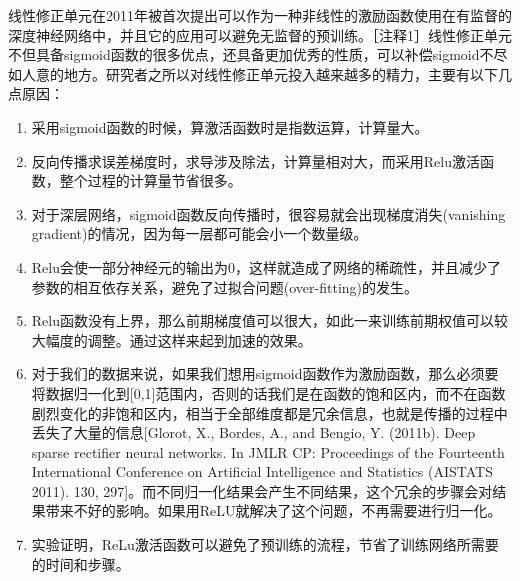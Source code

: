 		线性修正单元在2011年被首次提出可以作为一种非线性的激励函数使用在有监督的深度神经网络中，并且它的应用可以避免无监督的预训练。［注释1］线性修正单元不但具备sigmoid函数的很多优点，还具备更加优秀的性质，可以补偿sigmoid不尽如人意的地方。研究者之所以对线性修正单元投入越来越多的精力，主要有以下几点原因：
		\begin{enumerate}
		\item 采用sigmoid函数的时候，算激活函数时是指数运算，计算量大。
		\item 反向传播求误差梯度时，求导涉及除法，计算量相对大，而采用Relu激活函数，整个过程的计算量节省很多。
		\item 对于深层网络，sigmoid函数反向传播时，很容易就会出现梯度消失(vanishing gradient)的情况，因为每一层都可能会小一个数量级。
		\item Relu会使一部分神经元的输出为0，这样就造成了网络的稀疏性，并且减少了参数的相互依存关系，避免了过拟合问题(over-fitting)的发生。
		\item Relu函数没有上界，那么前期梯度值可以很大，如此一来训练前期权值可以较大幅度的调整。通过这样来起到加速的效果。
		\item 对于我们的数据来说，如果我们想用sigmoid函数作为激励函数，那么必须要将数据归一化到[0,1]范围内，否则的话我们是在函数的饱和区内，而不在函数剧烈变化的非饱和区内，相当于全部维度都是冗余信息，也就是传播的过程中丢失了大量的信息[Glorot, X., Bordes, A., and Bengio, Y. (2011b). Deep sparse rectifier neural networks. In JMLR CP: Proceedings of the Fourteenth International Conference on Artificial Intelligence and Statistics (AISTATS 2011). 130, 297]。而不同归一化结果会产生不同结果，这个冗余的步骤会对结果带来不好的影响。如果用ReLU就解决了这个问题，不再需要进行归一化。
		\item 实验证明，ReLu激活函数可以避免了预训练的流程，节省了训练网络所需要的时间和步骤。
		
		\end{enumerate}
		
